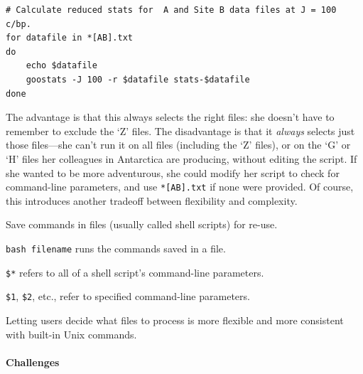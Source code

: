 \documentclass{book}
\begin{document}
\begin{verbatim}
# Calculate reduced stats for  A and Site B data files at J = 100 c/bp.
for datafile in *[AB].txt
do
    echo $datafile
    goostats -J 100 -r $datafile stats-$datafile
done
\end{verbatim}

The advantage is that this always selects the right files: she doesn't
have to remember to exclude the `Z' files. The disadvantage is that it
\emph{always} selects just those files---she can't run it on all files
(including the `Z' files), or on the `G' or `H' files her colleagues in
Antarctica are producing, without editing the script. If she wanted to
be more adventurous, she could modify her script to check for
command-line parameters, and use \texttt{*{[}AB{]}.txt} if none were
provided. Of course, this introduces another tradeoff between
flexibility and complexity.

\begin{keypoints}
\begin{swcitemize}
\item
  Save commands in files (usually called shell scripts) for re-use.
\item
  \texttt{bash filename} runs the commands saved in a file.
\item
  \texttt{\$*} refers to all of a shell script's command-line
  parameters.
\item
  \texttt{\$1}, \texttt{\$2}, etc., refer to specified command-line
  parameters.
\item
  Letting users decide what files to process is more flexible and more
  consistent with built-in Unix commands.
\end{swcitemize}
\end{keypoints}

\mbox{}\paragraph{Challenges}
\end{document}
